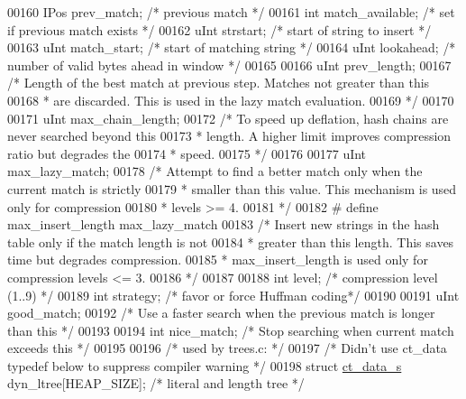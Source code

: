 \begin{DoxyCode}
00160     IPos prev\_match;             \textcolor{comment}{/* previous match */}
00161     \textcolor{keywordtype}{int} match\_available;         \textcolor{comment}{/* set if previous match exists */}
00162     uInt strstart;               \textcolor{comment}{/* start of string to insert */}
00163     uInt match\_start;            \textcolor{comment}{/* start of matching string */}
00164     uInt lookahead;              \textcolor{comment}{/* number of valid bytes ahead in window */}
00165 
00166     uInt prev\_length;
00167     \textcolor{comment}{/* Length of the best match at previous step. Matches not greater than this}
00168 \textcolor{comment}{     * are discarded. This is used in the lazy match evaluation.}
00169 \textcolor{comment}{     */}
00170 
00171     uInt max\_chain\_length;
00172     \textcolor{comment}{/* To speed up deflation, hash chains are never searched beyond this}
00173 \textcolor{comment}{     * length.  A higher limit improves compression ratio but degrades the}
00174 \textcolor{comment}{     * speed.}
00175 \textcolor{comment}{     */}
00176 
00177     uInt max\_lazy\_match;
00178     \textcolor{comment}{/* Attempt to find a better match only when the current match is strictly}
00179 \textcolor{comment}{     * smaller than this value. This mechanism is used only for compression}
00180 \textcolor{comment}{     * levels >= 4.}
00181 \textcolor{comment}{     */}
00182 \textcolor{preprocessor}{#   define max\_insert\_length  max\_lazy\_match}
00183     \textcolor{comment}{/* Insert new strings in the hash table only if the match length is not}
00184 \textcolor{comment}{     * greater than this length. This saves time but degrades compression.}
00185 \textcolor{comment}{     * max\_insert\_length is used only for compression levels <= 3.}
00186 \textcolor{comment}{     */}
00187 
00188     \textcolor{keywordtype}{int} level;    \textcolor{comment}{/* compression level (1..9) */}
00189     \textcolor{keywordtype}{int} strategy; \textcolor{comment}{/* favor or force Huffman coding*/}
00190 
00191     uInt good\_match;
00192     \textcolor{comment}{/* Use a faster search when the previous match is longer than this */}
00193 
00194     \textcolor{keywordtype}{int} nice\_match; \textcolor{comment}{/* Stop searching when current match exceeds this */}
00195 
00196                 \textcolor{comment}{/* used by trees.c: */}
00197     \textcolor{comment}{/* Didn't use ct\_data typedef below to suppress compiler warning */}
00198     \textcolor{keyword}{struct }\hyperlink{structct__data__s}{ct\_data\_s} dyn\_ltree[HEAP\_SIZE];   \textcolor{comment}{/* literal and length tree */}

\end{DoxyCode}
